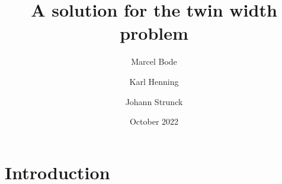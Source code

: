 \documentclass[acmsmall]{acmart}
\date{October 2022}
\title{A solution for the twin width problem}
\author{Marcel Bode}
\author{Karl Henning}
\author{Johann Strunck}
\begin{document}
\maketitle

\section{Introduction}





\cite{bonnet2021twini}
\cite{bonnet2021twinii}
\end{document}
